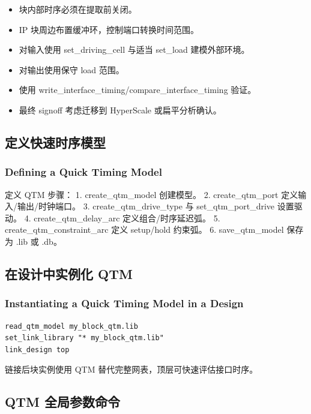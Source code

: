 \begin{itemize}
  \item 块内部时序必须在提取前关闭。
  \item IP 块周边布置缓冲环，控制端口转换时间范围。
  \item 对输入使用 set_driving_cell 与适当 set_load 建模外部环境。
  \item 对输出使用保守 load 范围。
  \item 使用 write_interface_timing/compare_interface_timing 验证。
  \item 最终 signoff 考虑迁移到 HyperScale 或扁平分析确认。
\end{itemize}

\subsection{定义快速时序模型}
\subsubsection*{Defining a Quick Timing Model}



定义 QTM 步骤：
1. create_qtm_model 创建模型。
2. create_qtm_port 定义输入/输出/时钟端口。
3. create_qtm_drive_type 与 set_qtm_port_drive 设置驱动。
4. create_qtm_delay_arc 定义组合/时序延迟弧。
5. create_qtm_constraint_arc 定义 setup/hold 约束弧。
6. save_qtm_model 保存为 .lib 或 .db。

\subsection{在设计中实例化 QTM}
\subsubsection*{Instantiating a Quick Timing Model in a Design}

\begin{lstlisting}
read_qtm_model my_block_qtm.lib
set_link_library "* my_block_qtm.lib"
link_design top
\end{lstlisting}

链接后块实例使用 QTM 替代完整网表，顶层可快速评估接口时序。

\subsection{QTM 全局参数命令}
